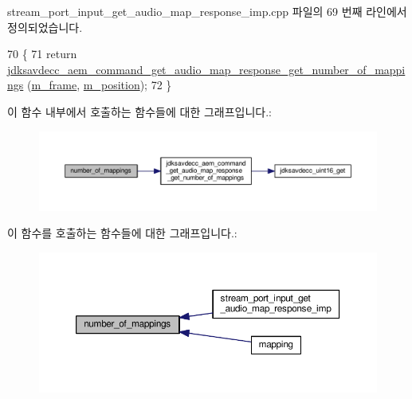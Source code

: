 stream\+\_\+port\+\_\+input\+\_\+get\+\_\+audio\+\_\+map\+\_\+response\+\_\+imp.\+cpp 파일의 69 번째 라인에서 정의되었습니다.


\begin{DoxyCode}
70 \{
71     \textcolor{keywordflow}{return} \hyperlink{group__command__get__audio__map__response_gad2cadbf9180c687c17781f6038a0fe3b}{jdksavdecc\_aem\_command\_get\_audio\_map\_response\_get\_number\_of\_mappings}
      (\hyperlink{classavdecc__lib_1_1stream__port__input__get__audio__map__response__imp_a50417969cf438e7c8d698726bbbe2ff9}{m\_frame}, \hyperlink{classavdecc__lib_1_1stream__port__input__get__audio__map__response__imp_af5e691c4a8a0feb07f48440b321206cd}{m\_position});
72 \}
\end{DoxyCode}


이 함수 내부에서 호출하는 함수들에 대한 그래프입니다.\+:
\nopagebreak
\begin{figure}[H]
\begin{center}
\leavevmode
\includegraphics[width=350pt]{classavdecc__lib_1_1stream__port__input__get__audio__map__response__imp_a3928eb3903b4e082cbc7d6d29146aabd_cgraph}
\end{center}
\end{figure}




이 함수를 호출하는 함수들에 대한 그래프입니다.\+:
\nopagebreak
\begin{figure}[H]
\begin{center}
\leavevmode
\includegraphics[width=350pt]{classavdecc__lib_1_1stream__port__input__get__audio__map__response__imp_a3928eb3903b4e082cbc7d6d29146aabd_icgraph}
\end{center}
\end{figure}




